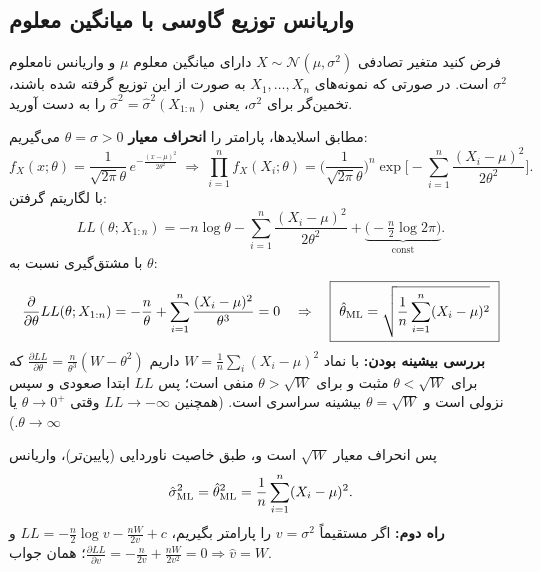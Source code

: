 \subsection{واریانس توزیع گاوسی با میانگین معلوم}
\begin{example}
فرض کنید متغیر تصادفی $X\sim\mathcal N(\mu,\sigma^2)$ دارای میانگین معلوم $\mu$ و واریانس نامعلوم $\sigma^2$ است. در صورتی که نمونه‌های $X_1,\ldots,X_n$ به صورت  از این توزیع گرفته شده باشند، تخمین‌گر  برای $\sigma^2$، یعنی $\hat\sigma^2=\hat\sigma^2(X_{1:n})$ را به دست آورید.
\begin{solution}
مطابق اسلایدها، پارامتر را \textbf{انحراف معیار} $\theta=\sigma>0$ می‌گیریم:
\[
f_X(x;\theta)=\frac{1}{\sqrt{2\pi}\theta}\,e^{-\frac{(x-\mu)^2}{2\theta^2}}
\ \Rightarrow\
\prod_{i=1}^nf_X(X_i;\theta)=\Big(\frac{1}{\sqrt{2\pi}\theta}\Big)^n\exp\Big[-\sum_{i=1}^n\frac{(X_i-\mu)^2}{2\theta^2}\Big].
\]
با لگاریتم گرفتن:
\[
LL(\theta;X_{1:n})=-n\log\theta-\sum_{i=1}^n\frac{(X_i-\mu)^2}{2\theta^2}+\underbrace{\Big(-\tfrac n2\log2\pi\Big)}_{\mathrm{const}} .
\]
با مشتق‌گیری نسبت به $\theta$:
\[
\frac{\partial}{\partial\theta}LL(\theta;X_{1:n})=-\frac n\theta+\sum_{i=1}^n\frac{(X_i-\mu)^2}{\theta^3}=0
\quad\Rightarrow\quad
\boxed{\ \hat\theta_\ML=\sqrt{\frac1n\sum_{i=1}^n(X_i-\mu)^2}\ }
\]
\textbf{بررسی بیشینه بودن:} با نماد $W=\frac1n\sum_i(X_i-\mu)^2$ داریم $\frac{\partial LL}{\partial\theta}=\frac{n}{\theta^3}(W-\theta^2)$ که برای $\theta<\sqrt W$ مثبت و برای $\theta>\sqrt W$ منفی است؛ پس $LL$ ابتدا صعودی و سپس نزولی است و $\theta=\sqrt W$ بیشینه سراسری است. (همچنین $LL\to-\infty$ وقتی $\theta\to0^+$ یا $\theta\to\infty$.)

پس  انحراف معیار $\sqrt W$ است و، طبق خاصیت ناوردایی (پایین‌تر)،  واریانس
\[
\hat\sigma^2_{\mathrm{ML}}=\hat\theta_{\mathrm{ML}}^2=\frac1n\sum_{i=1}^n(X_i-\mu)^2 .
\]
\textbf{راه دوم:} اگر مستقیماً $v=\sigma^2$ را پارامتر بگیریم، $LL=-\frac n2\log v-\frac{nW}{2v}+c$ و $\frac{\partial LL}{\partial v}=-\frac{n}{2v}+\frac{nW}{2v^2}=0\Rightarrow\hat v=W$؛ همان جواب.
\end{solution}
\end{example}

